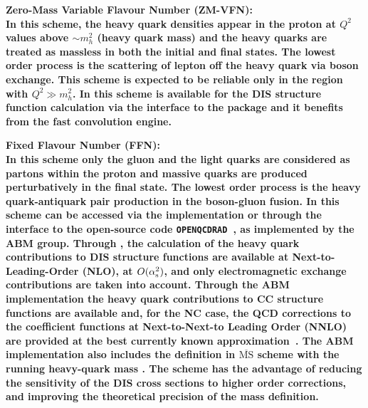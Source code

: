 \begin{description}
\item \bf{Zero-Mass Variable Flavour Number (ZM-VFN)}\rm \cite{ZMVFNpub}:
\\
In this scheme, the
heavy quark densities appear in the proton at $Q^2$ values above $\sim m_h^2$ (heavy quark mass)
and the heavy quarks
are treated as massless in both the initial 
and final states. The lowest order process is the
scattering of lepton off the heavy quark via boson exchange.
This scheme is expected to be reliable only in the region with $Q^2 \gg m_h^2$.
In \fitter this scheme is available for the DIS structure function calculation 
via the interface to the \qcdnum \cite{qcdnum} package and it benefits 
from the fast \qcdnum convolution engine.

\item \bf {Fixed Flavour Number (FFN)}\rm \cite{Laenen:1992, Laenen:1993, Riem:1995}: 
\\
In this scheme only the gluon and the light quarks are considered
as partons within the proton and massive 
quarks are produced perturbatively in the final state.
The lowest order process is
the heavy quark-antiquark pair production in the boson-gluon fusion.
In \fitter this scheme can be accessed via the 
\qcdnum implementation or through the interface to the open-source code \texttt{OPENQCDRAD}~\cite{openqcdrad:page}, as implemented by the ABM group.
Through \qcdnum, the calculation of the heavy quark contributions to DIS structure functions
are available at Next-to-Leading-Order (NLO), at $O(\alpha_\mathrm{s}^2)$, and only electromagnetic exchange contributions are taken into account.
Through the ABM implementation the heavy quark contributions to CC structure functions are available 
and, for the NC case, the QCD corrections to the coefficient functions at Next-to-Next-to Leading Order (NNLO)
are provided at the best currently known approximation~\cite{SMoch:npb864}.
The ABM implementation also includes 
the definition in $\overline{\text{MS}}$ scheme with the running heavy-quark mass \cite{Alekhin:runm}.
The scheme has the advantage of reducing the sensitivity of the DIS cross sections to
higher order corrections, and improving the theoretical precision of the mass definition. 



\end{description}
